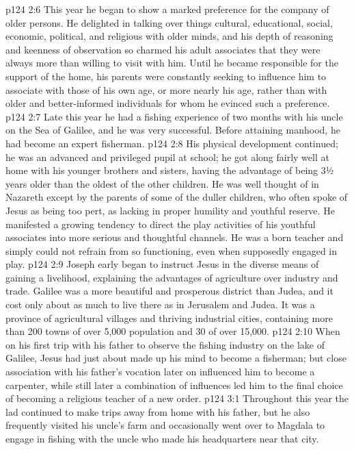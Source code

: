 \vs p124 2:6 This year he began to show a marked preference for the company of older persons. He delighted in talking over things cultural, educational, social, economic, political, and religious with older minds, and his depth of reasoning and keenness of observation so charmed his adult associates that they were always more than willing to visit with him. Until he became responsible for the support of the home, his parents were constantly seeking to influence him to associate with those of his own age, or more nearly his age, rather than with older and better\hyp{}informed individuals for whom he evinced such a preference.
\vs p124 2:7 Late this year he had a fishing experience of two months with his uncle on the Sea of Galilee, and he was very successful. Before attaining manhood, he had become an expert fisherman.
\vs p124 2:8 His physical development continued; he was an advanced and privileged pupil at school; he got along fairly well at home with his younger brothers and sisters, having the advantage of being 3½ years older than the oldest of the other children. He was well thought of in Nazareth except by the parents of some of the duller children, who often spoke of Jesus as being too pert, as lacking in proper humility and youthful reserve. He manifested a growing tendency to direct the play activities of his youthful associates into more serious and thoughtful channels. He was a born teacher and simply could not refrain from so functioning, even when supposedly engaged in play.
\vs p124 2:9 Joseph early began to instruct Jesus in the diverse means of gaining a livelihood, explaining the advantages of agriculture over industry and trade. Galilee was a more beautiful and prosperous district than Judea, and it cost only about  as much to live there as in Jerusalem and Judea. It was a province of agricultural villages and thriving industrial cities, containing more than 200 towns of over 5,000 population and 30 of over 15,000.
\vs p124 2:10 When on his first trip with his father to observe the fishing industry on the lake of Galilee, Jesus had just about made up his mind to become a fisherman; but close association with his father’s vocation later on influenced him to become a carpenter, while still later a combination of influences led him to the final choice of becoming a religious teacher of a new order.
\vs p124 3:1 Throughout this year the lad continued to make trips away from home with his father, but he also frequently visited his uncle’s farm and occasionally went over to Magdala to engage in fishing with the uncle who made his headquarters near that city.
